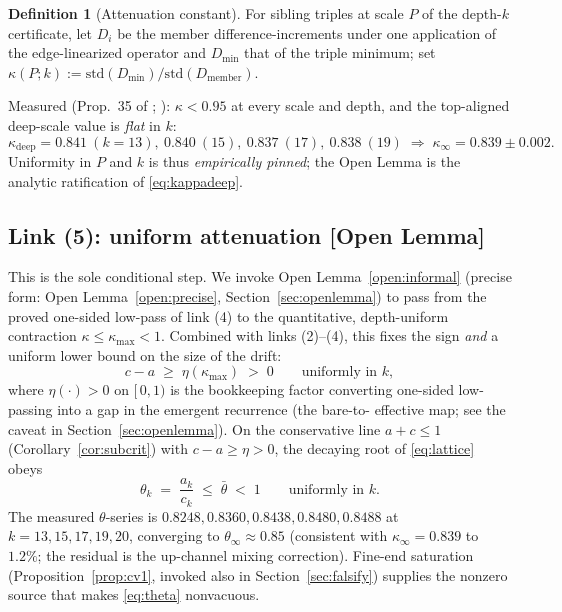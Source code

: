 \documentclass[11pt]{article}
\theoremstyle{definition}
\newtheorem{definition}[theorem]{Definition}
\theoremstyle{remark}
\newcommand{\kap}{\kappa}
\begin{document}
\begin{definition}[Attenuation constant]\label{def:kappa}
For sibling triples at scale $P$ of the depth-$k$ certificate, let $D_i$ be the
member difference-increments under one application of the edge-linearized
operator and $D_{\min}$ that of the triple minimum; set
$\kap(P; k) := \mathrm{std}(D_{\min}) / \mathrm{std}(D_{\mathrm{member}})$.
\end{definition}

Measured (Prop.~35 of \cite{NOTE}; \cite{Drift26}): $\kap < 0.95$ at every
scale and depth, and the top-aligned deep-scale value is \emph{flat} in $k$:
\begin{equation}
\kap_{\mathrm{deep}} = 0.841\ (k{=}13),\ 0.840\ (15),\ 0.837\ (17),\
0.838\ (19)
\;\Longrightarrow\;
\kap_\infty = 0.839 \pm 0.002 .
\label{eq:kappadeep}
\end{equation}
Uniformity in $P$ and $k$ is thus \emph{empirically pinned}; the Open Lemma is
the analytic ratification of \eqref{eq:kappadeep}.

\subsection{Link (5): uniform attenuation
\textnormal{[Open Lemma]}}
\label{sec:link5}

This is the sole conditional step. We invoke Open Lemma~\ref{open:informal}
(precise form: Open Lemma~\ref{open:precise}, Section~\ref{sec:openlemma}) to
pass from the proved one-sided low-pass of link (4) to the quantitative,
depth-uniform contraction $\kap \leq \kap_{\max} < 1$. Combined with links
(2)--(4), this fixes the sign \emph{and} a uniform lower bound on the size of
the drift:
\begin{equation}
c - a \;\geq\; \eta(\kap_{\max}) \;>\; 0
\qquad \text{uniformly in } k,
\label{eq:drift}
\end{equation}
where $\eta(\cdot) > 0$ on $[\,0, 1)$ is the bookkeeping factor converting
one-sided low-passing into a gap in the emergent recurrence (the bare-to-
effective map; see the caveat in Section~\ref{sec:openlemma}). On the
conservative line $a + c \leq 1$ (Corollary~\ref{cor:subcrit}) with
$c - a \geq \eta > 0$, the decaying root of \eqref{eq:lattice} obeys
\begin{equation}
\theta_k \;=\; \frac{a_k}{c_k} \;\leq\; \bar\theta \;<\; 1
\qquad \text{uniformly in } k .
\label{eq:theta}
\end{equation}
The measured $\theta$-series is $0.8248, 0.8360, 0.8438, 0.8480, 0.8488$ at
$k = 13, 15, 17, 19, 20$, converging to $\theta_\infty \approx 0.85$
(consistent with $\kap_\infty = 0.839$ to $1.2\%$; the residual is the
up-channel mixing correction). Fine-end saturation
(Proposition~\ref{prop:cv1}, invoked also in Section~\ref{sec:falsify}) supplies
the nonzero source that makes \eqref{eq:theta} nonvacuous.
\end{document}
